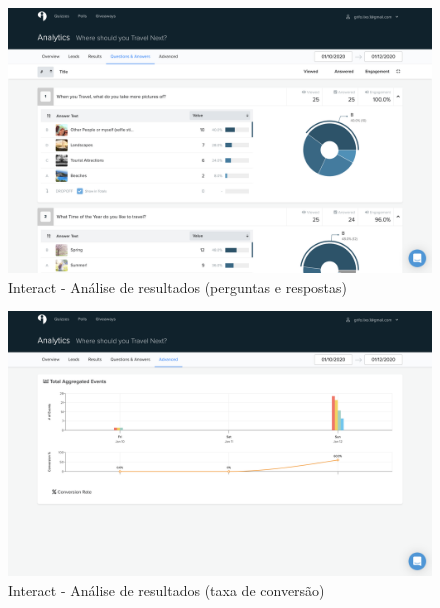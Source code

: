 \begin{figure}[ht!]
	\begin{center}
		\includegraphics[width=1\textwidth]{img/interact/data3}
		\caption{Interact - Análise de resultados (perguntas e respostas)}
		\label{fig:interact-data3}
	\end{center}
\end{figure}

\mbox{}
\begin{figure}[ht!]
	\begin{center}
		\includegraphics[width=1\textwidth]{img/interact/data4}
		\caption{Interact - Análise de resultados (taxa de conversão)}
		\label{fig:interact-data4}
	\end{center}
\end{figure}
\clearpage







